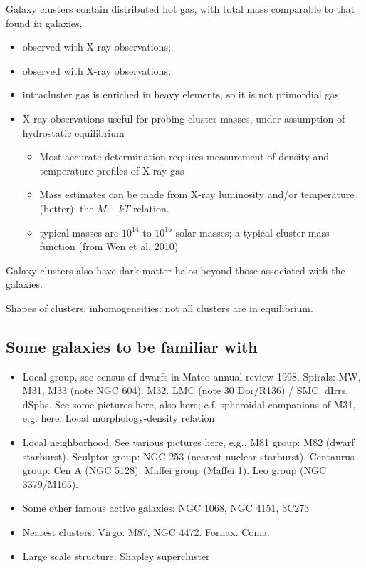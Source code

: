 \documentclass{article}
\begin{document}
Galaxy clusters contain distributed hot gas, with total mass comparable to that
found in galaxies.
\begin{itemize}
    \item observed with X-ray observations;
    \item observed with X-ray observations;
    \item intracluster gas is enriched in heavy elements, so it is not primordial gas
    \item X-ray observations useful for probing cluster masses, under assumption of hydrostatic equilibrium
        \begin{itemize}
            \item Most accurate determination requires measurement of density
                and temperature profiles of X-ray gas
            \item Mass estimates can be made from X-ray luminosity and/or
                temperature (better): the $M-kT$ relation.
            \item typical masses are $10^{14}$ to $10^{15}$ solar masses; a
                typical cluster mass function (from Wen et al. 2010)
        \end{itemize}
\end{itemize}
Galaxy clusters also have dark matter halos beyond those associated with the
galaxies.

Shapes of clusters, inhomogeneities: not all clusters are in equilibrium.


\subsection{Some galaxies to be familiar with}
\begin{itemize}
    \item Local group, see census of dwarfs in Mateo annual review 1998. Spirals: MW, M31, M33 (note NGC 604). M32. LMC (note 30 Dor/R136) / SMC. dIrrs, dSphs. See some pictures here, also here; c.f. spheroidal companions of M31, e.g. here. Local morphology-density relation
    \item Local neighborhood. See various pictures here, e.g., M81 group: M82 (dwarf starburst). Sculptor group: NGC 253 (nearest nuclear starburst). Centaurus group: Cen A (NGC 5128). Maffei group (Maffei 1). Leo group (NGC 3379/M105).
    \item Some other famous active galaxies: NGC 1068, NGC 4151, 3C273
    \item Nearest clusters. Virgo: M87, NGC 4472. Fornax. Coma.
    \item Large scale structure: Shapley supercluster
\end{itemize}
\end{document}
